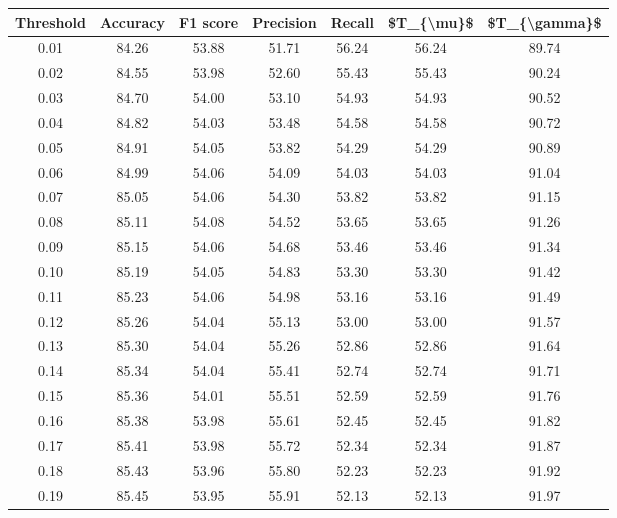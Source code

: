 \begin{tabular}{|c|c|c|c|c|c|c|}
\hline
 Threshold &  Accuracy &  F1 score &  Precision &  Recall &  \$T\_\{\textbackslash mu\}\$ &  \$T\_\{\textbackslash gamma\}\$ \\
\hline
      0.01 &     84.26 &     53.88 &      51.71 &   56.24 &      56.24 &         89.74 \\
      0.02 &     84.55 &     53.98 &      52.60 &   55.43 &      55.43 &         90.24 \\
      0.03 &     84.70 &     54.00 &      53.10 &   54.93 &      54.93 &         90.52 \\
      0.04 &     84.82 &     54.03 &      53.48 &   54.58 &      54.58 &         90.72 \\
      0.05 &     84.91 &     54.05 &      53.82 &   54.29 &      54.29 &         90.89 \\
      0.06 &     84.99 &     54.06 &      54.09 &   54.03 &      54.03 &         91.04 \\
      0.07 &     85.05 &     54.06 &      54.30 &   53.82 &      53.82 &         91.15 \\
      0.08 &     85.11 &     54.08 &      54.52 &   53.65 &      53.65 &         91.26 \\
      0.09 &     85.15 &     54.06 &      54.68 &   53.46 &      53.46 &         91.34 \\
      0.10 &     85.19 &     54.05 &      54.83 &   53.30 &      53.30 &         91.42 \\
      0.11 &     85.23 &     54.06 &      54.98 &   53.16 &      53.16 &         91.49 \\
      0.12 &     85.26 &     54.04 &      55.13 &   53.00 &      53.00 &         91.57 \\
      0.13 &     85.30 &     54.04 &      55.26 &   52.86 &      52.86 &         91.64 \\
      0.14 &     85.34 &     54.04 &      55.41 &   52.74 &      52.74 &         91.71 \\
      0.15 &     85.36 &     54.01 &      55.51 &   52.59 &      52.59 &         91.76 \\
      0.16 &     85.38 &     53.98 &      55.61 &   52.45 &      52.45 &         91.82 \\
      0.17 &     85.41 &     53.98 &      55.72 &   52.34 &      52.34 &         91.87 \\
      0.18 &     85.43 &     53.96 &      55.80 &   52.23 &      52.23 &         91.92 \\
      0.19 &     85.45 &     53.95 &      55.91 &   52.13 &      52.13 &         91.97 \\

\end{tabular}
